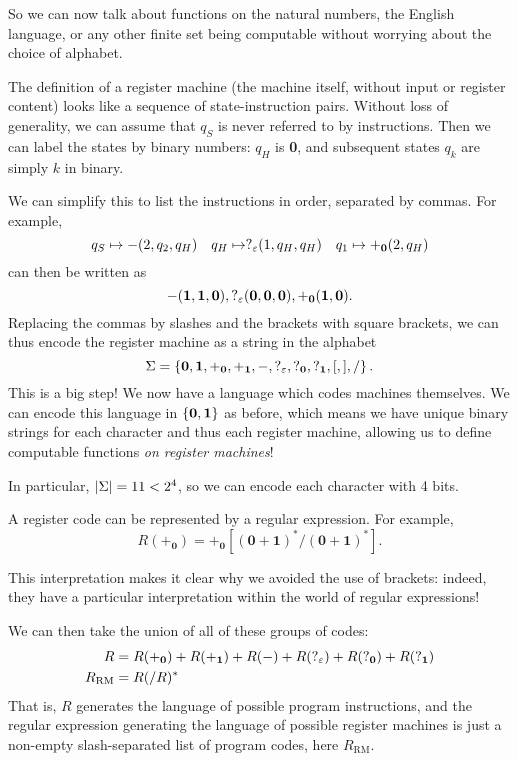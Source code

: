 \documentclass{article}
\begin{document}
So we can now talk about functions on the natural numbers, the English language, or any other finite set being computable without worrying about the choice of alphabet.

The definition of a register machine (the machine itself, without input or register content) looks like a sequence of state-instruction pairs. Without loss of generality, we can assume that $q_S$ is never referred to by instructions. Then we can label the states by binary numbers: $q_H$ is \textbf{0}, and subsequent states $q_k$ are simply $k$ in binary.

We can simplify this to list the instructions in order, separated by commas. For example,
\[
	q_S \mapsto -(2, q_2, q_H) \quad q_H \mapsto ?_\varepsilon(1, q_H, q_H) \quad q_1 \mapsto +_\textbf{0}(2, q_H)
\]
can then be written as
\[
	-(\textbf{1}, \textbf{1}, \textbf{0}), ?_\varepsilon(\textbf{0}, \textbf{0}, \textbf{0}), +_\textbf{0} (\textbf{1}, \textbf{0}).
\]
Replacing the commas by slashes and the brackets with square brackets, we can thus encode the register machine as a string in the alphabet
\[
	\Sigma = \left\lbrace \textbf{0}, \textbf{1}, +_\textbf{0}, +_\textbf{1}, -, ?_\varepsilon, ?_\textbf{0}, ?_\textbf{1}, [, ], / \right\rbrace.
\]
This is a big step! We now have a language which codes machines themselves. We can encode this language in $\left\lbrace \textbf{0}, \textbf{1} \right\rbrace$ as before, which means we have unique binary strings for each character and thus each register machine, allowing us to define computable functions \textit{on register machines}!

\begin{note}
	In particular, $\left\lvert \Sigma \right\rvert = 11 < 2^4$, so we can encode each character with 4 bits.
\end{note}

A register code can be represented by a regular expression. For example,
\[
	R(+_\textbf{0}) = +_\textbf{0}[(\textbf{0} + \textbf{1})^* / (\textbf{0} + \textbf{1})^*].
\]
\begin{note}
	This interpretation makes it clear why we avoided the use of brackets: indeed, they have a particular interpretation within the world of regular expressions!
\end{note}

We can then take the union of all of these groups of codes:
\begin{align*}
	R               & = R(+_\textbf{0}) + R(+_\textbf{1}) + R(-) + R(?_\varepsilon) + R(?_\textbf{0}) + R(?_\textbf{1}) \\
	R_{\mathrm{RM}} & = R(/R)^*                                                                                  
\end{align*}
That is, $R$ generates the language of possible program instructions, and the regular expression generating the language of possible register machines is just a non-empty slash-separated list of program codes, here $R_{\mathrm{RM}}$.
\end{document}
